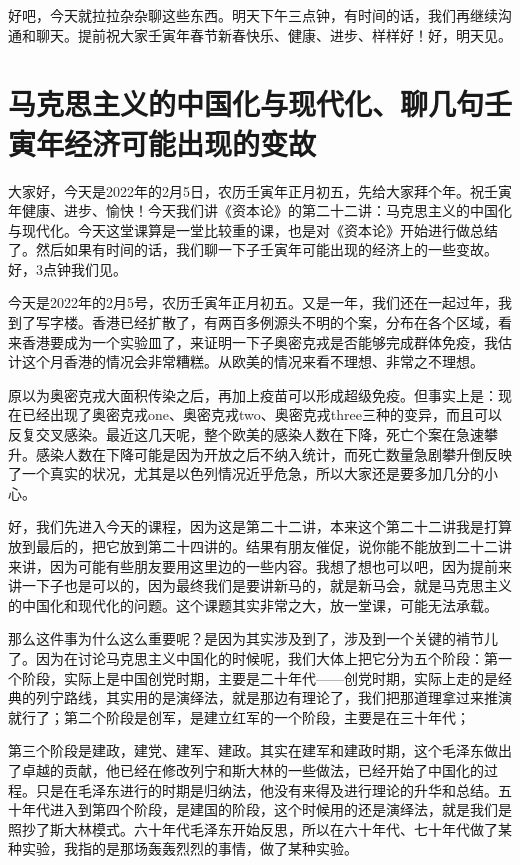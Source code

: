 \documentclass[UTF8, 12pt, a4paper]{ctexrep}
\begin{document}
好吧，今天就拉拉杂杂聊这些东西。明天下午三点钟，有时间的话，我们再继续沟通和聊天。提前祝大家壬寅年春节新春快乐、健康、进步、样样好！好，明天见。

\section{马克思主义的中国化与现代化、聊几句壬寅年经济可能出现的变故}

大家好，今天是2022年的2月5日，农历壬寅年正月初五，先给大家拜个年。祝壬寅年健康、进步、愉快！今天我们讲《资本论》的第二十二讲：马克思主义的中国化与现代化。今天这堂课算是一堂比较重的课，也是对《资本论》开始进行做总结了。然后如果有时间的话，我们聊一下子壬寅年可能出现的经济上的一些变故。好，3点钟我们见。

今天是2022年的2月5号，农历壬寅年正月初五。又是一年，我们还在一起过年，我到了写字楼。香港已经扩散了，有两百多例源头不明的个案，分布在各个区域，看来香港要成为一个实验皿了，来证明一下子奥密克戎是否能够完成群体免疫，我估计这个月香港的情况会非常糟糕。从欧美的情况来看不理想、非常之不理想。

原以为奥密克戎大面积传染之后，再加上疫苗可以形成超级免疫。但事实上是：现在已经出现了奥密克戎one、奥密克戎two、奥密克戎three三种的变异，而且可以反复交叉感染。最近这几天呢，整个欧美的感染人数在下降，死亡个案在急速攀升。感染人数在下降可能是因为开放之后不纳入统计，而死亡数量急剧攀升倒反映了一个真实的状况，尤其是以色列情况近乎危急，所以大家还是要多加几分的小心。

好，我们先进入今天的课程，因为这是第二十二讲，本来这个第二十二讲我是打算放到最后的，把它放到第二十四讲的。结果有朋友催促，说你能不能放到二十二讲来讲，因为可能有些朋友要用这里边的一些内容。我想了想也可以吧，因为提前来讲一下子也是可以的，因为最终我们是要讲新马的，就是新马会，就是马克思主义的中国化和现代化的问题。这个课题其实非常之大，放一堂课，可能无法承载。

那么这件事为什么这么重要呢？是因为其实涉及到了，涉及到一个关键的褃节儿了。因为在讨论马克思主义中国化的时候呢，我们大体上把它分为五个阶段：第一个阶段，实际上是中国创党时期，主要是二十年代——创党时期，实际上走的是经典的列宁路线，其实用的是演绎法，就是那边有理论了，我们把那道理拿过来推演就行了；第二个阶段是创军，是建立红军的一个阶段，主要是在三十年代；

第三个阶段是建政，建党、建军、建政。其实在建军和建政时期，这个毛泽东做出了卓越的贡献，他已经在修改列宁和斯大林的一些做法，已经开始了中国化的过程。只是在毛泽东进行的时期是归纳法，他没有来得及进行理论的升华和总结。五十年代进入到第四个阶段，是建国的阶段，这个时候用的还是演绎法，就是我们是照抄了斯大林模式。六十年代毛泽东开始反思，所以在六十年代、七十年代做了某种实验，我指的是那场轰轰烈烈的事情，做了某种实验。
\end{document}
